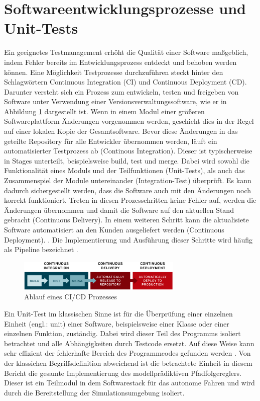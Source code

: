 \section{Softwareentwicklungsprozesse und Unit-Tests} \label{sec:CICD}
Ein geeignetes Testmanagement erhöht die Qualität einer Software maßgeblich, indem Fehler bereits im Entwicklungsprozess entdeckt und behoben werden können. Eine Möglichkeit Testprozesse durchzuführen steckt hinter den Schlagwörtern Continuous Integration (CI) und Continuous Deployment (CD). Darunter versteht sich ein Prozess zum entwickeln, testen und freigeben von Software unter Verwendung einer Versionsverwaltungssoftware, wie er in Abbildung \ref{fig:ci-cd-flow-desktop} dargestellt ist. Wenn in einem Modul einer größeren Softwareplattform Änderungen vorgenommen werden, geschieht dies in der Regel auf einer lokalen Kopie der Gesamtsoftware. Bevor diese Änderungen in das geteilte Repository für alle Entwickler übernommen werden, läuft ein automatisierter Testprozess ab (Continous Integration). Dieser ist typischerweise in Stages unterteilt, beispielsweise build, test und merge. Dabei wird sowohl die Funktionalität eines Moduls und der Teilfunktionen (Unit-Tests), als auch das Zusammenspiel der Module untereinander (Integration-Test) überprüft. Es kann dadurch sichergestellt werden, dass die Software auch mit den Änderungen noch korrekt funktioniert. Treten in diesen Prozesschritten keine Fehler auf, werden die Änderungen übernommen und damit die Software auf den aktuellen Stand gebracht (Continuous Delivery). In einem weiteren Schritt kann die aktualisiete Software automatisiert an den Kunden ausgeliefert werden (Continuous Deployment). \cite{redhat2024}. Die Implementierung und Ausführung dieser Schritte wird häufig als Pipeline bezeichnet \cite{Merode2023}.
\begin{figure}
    \centering
    \includegraphics[width=0.7\textwidth]{figures/2_Grundlagen/ci-cd-flow-desktop.png}
    \caption{Ablauf eines CI/CD Prozesses \cite{redhat2024}}
    \label{fig:ci-cd-flow-desktop}
\end{figure}

Ein Unit-Test im klassischen Sinne ist für die Überprüfung einer einzelnen Einheit (engl.: unit) einer Software, beispielsweise einer Klasse oder einer einzelnen Funktion, zuständig. Dabei wird dieser Teil des Programms isoliert betrachtet und alle Abhängigkeiten durch Testcode ersetzt. Auf diese Weise kann sehr effizient der fehlerhafte Bereich des Programmcodes gefunden werden \cite{Khorikov2020}. Von der klassichen Begriffsdefinition abweichend ist die betrachtete Einheit in diesem Bericht die gesamte Implementierung des modellprädiktiven Pfadfolgereglers. Dieser ist ein Teilmodul in dem Softwarestack für das autonome Fahren und wird durch die Bereitstellung der Simulationsumgebung isoliert. 